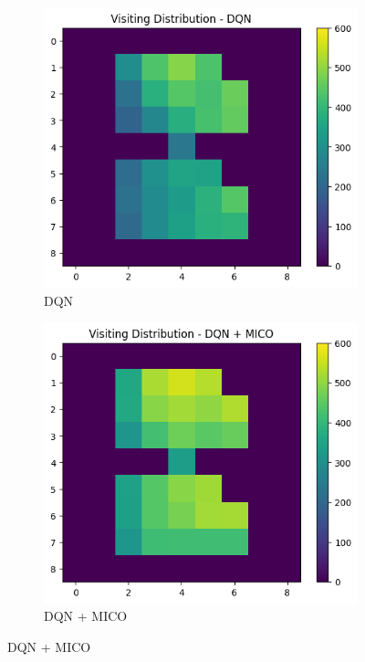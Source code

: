 \begin{figure}[h]
    \centering
    \hspace*{\fill}
    \begin{subfigure}{0.45\textwidth}
        \centering %
        \includegraphics[width=0.70\linewidth]{Results/grid_world/visitation_distribution_dqn.png}
        \caption{DQN}
        \label{fig:visitation_distributions_dqn}
    \end{subfigure}
    \hspace*{\fill} %
    \begin{subfigure}{0.45\textwidth}
        \centering %
        \includegraphics[width=0.70\linewidth]{Results/grid_world/visitation_distribution_dqn_mico.png}
        \caption{DQN + MICO}
        \label{fig:visitation_distributions_mico}
    \end{subfigure}

\end{figure}

